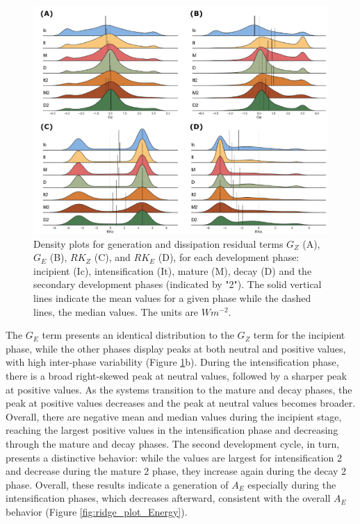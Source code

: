 \begin{figure}[!htbp]
\centering
\includegraphics[width=\textwidth]{figs_5/ridge_plot_Generation and Dissipation Terms.pdf}
\caption[Density Plots - Energy Terms]{Density plots for generation and dissipation residual terms $G_Z$ (A), $G_E$ (B), $RK_Z$ (C), and $RK_E$ (D), for each development phase: incipient (Ic), intensification (It), mature (M), decay (D) and the secondary development phases (indicated by "2"). The solid vertical lines indicate the mean values for a given phase while the dashed lines, the median values. The units are $W m^{-2}$.}
\label{fig:ridge_plot_Generation}
\end{figure}

The $G_E$ term presents an identical distribution to the $G_Z$ term for the incipient phase, while the other phases display peaks at both neutral and positive values, with high inter-phase variability (Figure \ref{fig:ridge_plot_Generation}b). During the intensification phase, there is a broad right-skewed peak at neutral values, followed by a sharper peak at positive values. As the systems transition to the mature and decay phases, the peak at positive values decreases and the peak at neutral values becomes broader. Overall, there are negative mean and median values during the incipient stage, reaching the largest positive values in the intensification phase and decreasing through the mature and decay phases. The second development cycle, in turn, presents a distinctive behavior: while the values are largest for intensification 2 and decrease during the mature 2 phase, they increase again during the decay 2 phase. Overall, these results indicate a generation of $A_E$ especially during the intensification phases, which decreases afterward, consistent with the overall $A_E$ behavior (Figure \ref{fig:ridge_plot_Energy}).

